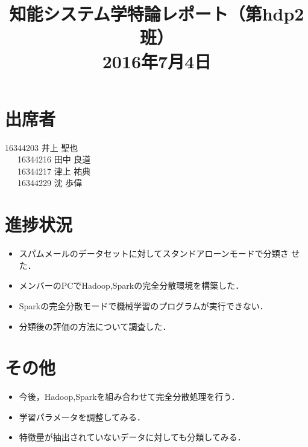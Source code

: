 \documentclass[a4paper,12pt]{jarticle}
\begin{document}
%
\title{\vspace{-30mm}知能システム学特論レポート（第hdp2班）\\ 2016年7月4日}
\date{}
%
%
\maketitle
%
\vspace{-30mm}
%
\section{出席者}
16344203 井上 聖也\\
~~~16344216 田中 良道\\
~~~16344217 津上 祐典\\
~~~16344229 沈 歩偉
\section{進捗状況}
\begin{itemize}
 \item スパムメールのデータセットに対してスタンドアローンモードで分類さ
	   せた．
 \item メンバーのPCでHadoop,Sparkの完全分散環境を構築した．
 \item Sparkの完全分散モードで機械学習のプログラムが実行できない．
 \item 分類後の評価の方法について調査した．
\end{itemize}

\section{その他}
\begin{itemize}
 \item 今後，Hadoop,Sparkを組み合わせて完全分散処理を行う．
 \item 学習パラメータを調整してみる．
 \item 特徴量が抽出されていないデータに対しても分類してみる．
\end{itemize}
\end{document}
